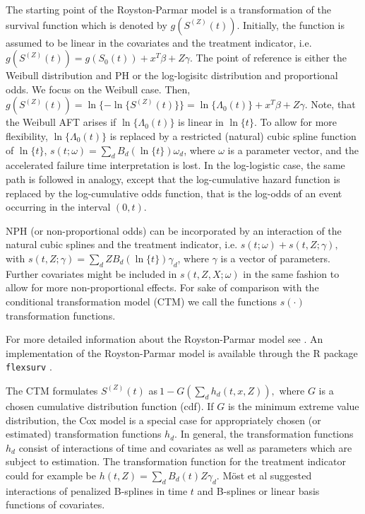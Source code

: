 The starting point of the Royston-Parmar model is a transformation of the survival function which is denoted by $g(S^{(Z)}(t))$.
Initially, the function is assumed to be linear in the covariates and the treatment indicator, i.e. $g(S^{(Z)}(t)) = g(S_0(t)) + x^T\beta + Z \gamma$.
The point of reference is either the Weibull distribution and PH or the log-logisitc distribution and proportional odds.
We focus on the Weibull case.
Then, $g(S^{(Z)}(t)) = \ln\{-\ln\{S^{(Z)}(t)\}\} = \ln \{ \Lambda_{0}(t)\}+x^T\beta + Z \gamma$.
Note, that the Weibull AFT arises if $\ln \{\Lambda_{0}(t)\}$ is linear in $\ln\{t\}$.
To allow for more flexibility, $\ln \{\Lambda_{0}(t)\}$ is replaced by a restricted (natural) cubic spline function of $\ln\{t\}$, $s(t;\omega) = \sum_d B_d(\ln\{t\}) \omega_d$, where $\omega$ is a parameter vector, and the accelerated failure time interpretation is lost.
In the log-logistic case, the same path is followed in analogy, except that the log-cumulative hazard function is replaced by the log-cumulative odds function, that is the log-odds of an event occurring in the interval $\left( 0,t \right)$.

\noindent NPH (or non-proportional odds) can be incorporated by an interaction of the natural cubic splines and the treatment indicator, i.e.
$s(t;\omega) + s(t,Z;\gamma),$ with  $s(t,Z;\gamma)= \sum_d Z B_d(\ln\{t\}) \gamma_{d}$, where $\gamma$ is a vector of parameters.
Further covariates might be included in $s(t,Z,X;\omega)$ in the same fashion to allow for more non-proportional effects.
For sake of comparison with the conditional transformation model (CTM) we call the functions $s(\cdot)$ transformation functions.

For more detailed information about the Royston-Parmar model see \cite{Royston.2002}. An implementation of the Royston-Parmar model is available through the R package \texttt{flexsurv} \cite{Jackson.2021}. 

\noindent The CTM formulates $S^{\left(Z\right)}\left(t\right)$ as$\ 1-G\left(\sum_d{h_d\left(t,x,Z\right)}\right),$ where $G$ is a chosen cumulative distribution function (cdf).
If $G$ is the minimum extreme value distribution, the Cox model is a special case for appropriately chosen (or estimated) transformation functions $h_d$.
In general, the transformation functions $h_d$ consist of interactions of time and covariates as well as parameters which are subject to estimation. 
The transformation function for the treatment indicator could for example be $h(t,Z) = \sum_d B_d(t)Z \gamma_d$.
M\"ost et al \cite{Most.2015} suggested interactions of penalized B-splines in time $t$ and B-splines or linear basis functions of covariates.

